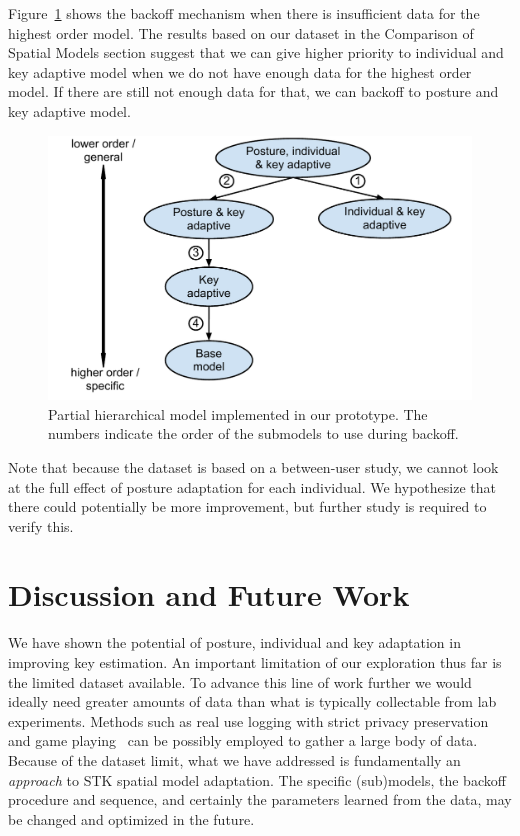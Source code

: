 \documentclass{sigchi}
\begin{document}
Figure~\ref{fig:partial-hierarchy} shows the backoff mechanism when there is insufficient data for the highest order model. The results based on our dataset in the Comparison of Spatial Models section suggest that we
can give higher priority to individual and key adaptive model when we do not have enough data for
the highest order model. If there are still not enough data for that, we 
can backoff to posture and key adaptive model. 

\begin{figure}
  \centering
  \includegraphics[width=0.9\columnwidth]{figures/partial-hierarchy.pdf}
  \caption{Partial hierarchical model implemented in our prototype. The numbers indicate the order of the 
submodels to use during backoff.}
  \label{fig:partial-hierarchy}
\end{figure}
Note that because the dataset is based on a between-user study, we cannot look
at the full effect of posture adaptation for each individual. We hypothesize that there could potentially be more improvement, but further study is required to verify this.

\section{Discussion and Future Work}
We have shown the potential of posture, individual and key adaptation in 
improving key estimation. An important limitation of our exploration thus far is
the limited dataset available. To advance this line of work further we would ideally need greater 
amounts of data than what is typically collectable from lab experiments. Methods
such as real use logging with strict privacy preservation and game 
playing~\cite{Rudchenko:2011} can be possibly employed to gather a large body of
data. Because of the dataset limit, what we have addressed is fundamentally an 
\textit{approach} to STK spatial model adaptation. The specific (sub)models, the
backoff procedure and sequence, and certainly the parameters learned from the 
data, may be changed and optimized in the future.
\end{document}
